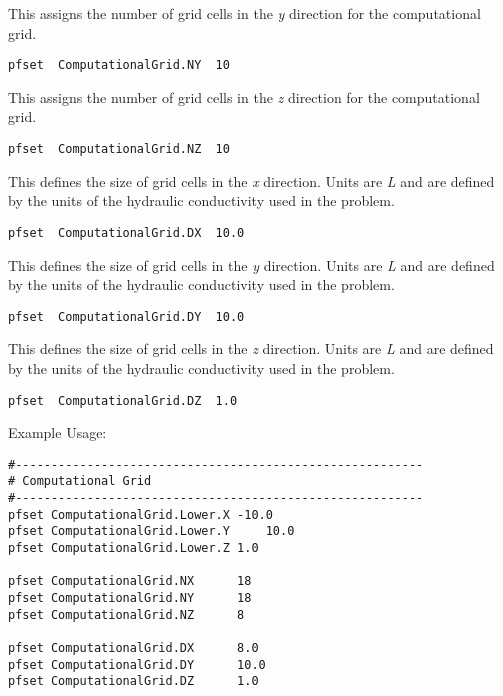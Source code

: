 {This assigns the number of grid cells in the \emph{y} direction for the computational grid.}
\begin{display}\begin{verbatim}
pfset  ComputationalGrid.NY  10
\end{verbatim}\end{display}

{This assigns the number of grid cells in the \emph{z} direction for the computational grid.}
\begin{display}\begin{verbatim}
pfset  ComputationalGrid.NZ  10
\end{verbatim}\end{display}

{This defines the size of grid cells in the \emph{x} direction. Units are \emph{L} and are
defined by the units of the hydraulic conductivity used in the problem.}
\begin{display}\begin{verbatim}
pfset  ComputationalGrid.DX  10.0
\end{verbatim}\end{display}

{This defines the size of grid cells in the \emph{y} direction. Units are \emph{L} and are
defined by the units of the hydraulic conductivity used in the problem.}
\begin{display}\begin{verbatim}
pfset  ComputationalGrid.DY  10.0
\end{verbatim}\end{display}

{This defines the size of grid cells in the \emph{z} direction. Units are \emph{L} and are
defined by the units of the hydraulic conductivity used in the problem.}
\begin{display}\begin{verbatim}
pfset  ComputationalGrid.DZ  1.0
\end{verbatim}\end{display}


Example Usage: \begin{verbatim}
#---------------------------------------------------------
# Computational Grid
#---------------------------------------------------------
pfset ComputationalGrid.Lower.X	-10.0
pfset ComputationalGrid.Lower.Y     10.0
pfset ComputationalGrid.Lower.Z	1.0

pfset ComputationalGrid.NX		18
pfset ComputationalGrid.NY		18
pfset ComputationalGrid.NZ		8

pfset ComputationalGrid.DX		8.0
pfset ComputationalGrid.DY		10.0
pfset ComputationalGrid.DZ		1.0
\end{verbatim}

